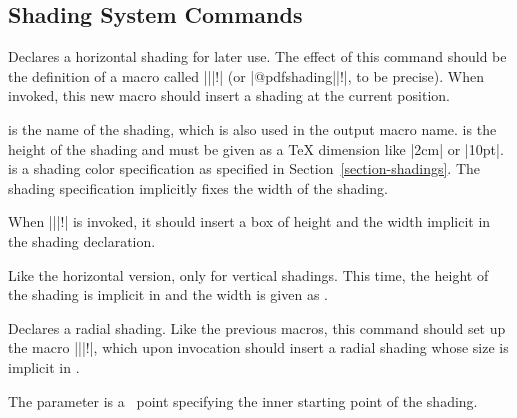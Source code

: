 \subsection{Shading System Commands}

\begin{command}{\pgfsys@horishading{}}
    Declares a horizontal shading for later use. The effect of this command
    should be the definition of a macro called |\@pgfshading||!| (or
    |\csname @pdfshading||!\endcsname|, to be precise). When
    invoked, this new macro should insert a shading at the current position.

     is the name of the shading, which is also used in the output
    macro name.  is the height of the shading and must be given as
    a \TeX{} dimension like |2cm| or |10pt|.  is a shading
    color specification as specified in Section~\ref{section-shadings}. The
    shading specification implicitly fixes the width of the shading.

    When |\@pgfshading||!| is invoked, it should insert a box of
    height  and the width implicit in the shading declaration.
\end{command}

\begin{command}{\pgfsys@vertshading{}}
    Like the horizontal version, only for vertical shadings. This time, the
    height of the shading is implicit in  and the width is
    given as .
\end{command}

\begin{command}{\pgfsys@radialshading{}}
    Declares a radial shading. Like the previous macros, this command should
    set up the macro |\@pgfshading||!|, which upon invocation should
    insert a radial shading whose size is implicit in .

    The parameter  is a \pgfname\ point specifying the
    inner starting point of the shading.
\end{command}

